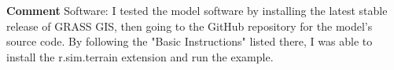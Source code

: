 \documentclass[gmd, manuscript]{copernicus}
\begin{document}
\noindent\textbf{Comment}
Software: I tested the model software by installing the latest stable release of GRASS GIS, then going to the GitHub repository for the model’s source code. By following the "Basic Instructions" listed there, I was able to install the r.sim.terrain extension and run the example.

\clearpage



\noappendix 
\end{document}
